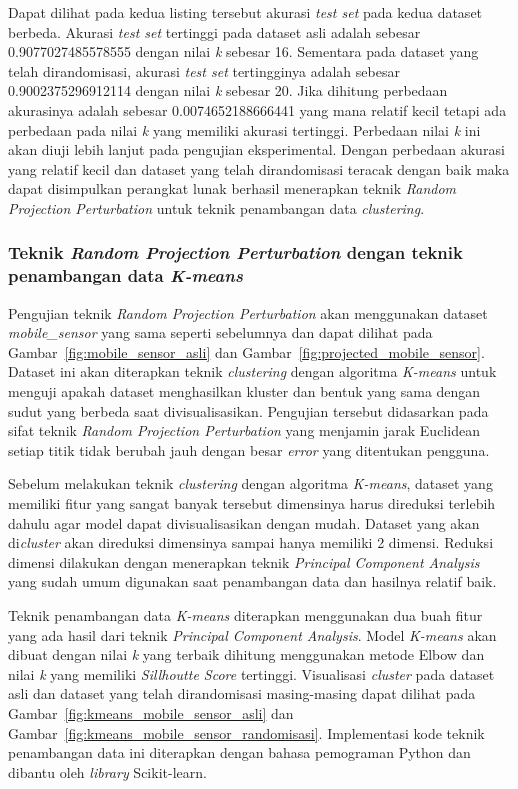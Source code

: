 Dapat dilihat pada kedua listing tersebut akurasi \textit{test set} pada kedua dataset berbeda. Akurasi \textit{test set} tertinggi pada dataset asli adalah sebesar 0.9077027485578555 dengan nilai \textit{k} sebesar 16. Sementara pada dataset yang telah dirandomisasi, akurasi \textit{test set} tertingginya adalah sebesar 0.9002375296912114 dengan nilai \textit{k} sebesar 20. Jika dihitung perbedaan akurasinya adalah sebesar 0.0074652188666441 yang mana relatif kecil tetapi ada perbedaan pada nilai \textit{k} yang memiliki akurasi tertinggi. Perbedaan nilai \textit{k} ini akan diuji lebih lanjut pada pengujian eksperimental. Dengan perbedaan akurasi yang relatif kecil dan dataset yang telah dirandomisasi teracak dengan baik maka dapat disimpulkan perangkat lunak berhasil menerapkan teknik \textit{Random Projection Perturbation} untuk teknik penambangan data \textit{clustering}.

\subsubsection{Teknik \textit{Random Projection Perturbation} dengan teknik penambangan data \textit{K-means}}
\label{sec:rpp-kmeans}

Pengujian teknik \textit{Random Projection Perturbation} akan menggunakan dataset \textit{mobile\_sensor} yang sama seperti sebelumnya dan dapat dilihat pada Gambar~\ref{fig:mobile_sensor_asli} dan Gambar~\ref{fig:projected_mobile_sensor}. Dataset ini akan diterapkan teknik \textit{clustering} dengan algoritma \textit{K-means} untuk menguji apakah dataset menghasilkan kluster dan bentuk yang sama dengan sudut yang berbeda saat divisualisasikan. Pengujian tersebut didasarkan pada sifat teknik \textit{Random Projection Perturbation} yang menjamin jarak Euclidean setiap titik tidak berubah jauh dengan besar \textit{error} yang ditentukan pengguna.

Sebelum melakukan teknik \textit{clustering} dengan algoritma \textit{K-means}, dataset yang memiliki fitur yang sangat banyak tersebut dimensinya harus direduksi terlebih dahulu agar model dapat divisualisasikan dengan mudah. Dataset yang akan di\textit{cluster} akan direduksi dimensinya sampai hanya memiliki 2 dimensi. Reduksi dimensi dilakukan dengan menerapkan teknik \textit{Principal Component Analysis} yang sudah umum digunakan saat penambangan data dan hasilnya relatif baik.

Teknik penambangan data \textit{K-means} diterapkan menggunakan dua buah fitur yang ada hasil dari teknik \textit{Principal Component Analysis}. Model \textit{K-means} akan dibuat dengan nilai \textit{k} yang terbaik dihitung menggunakan metode Elbow dan nilai \textit{k} yang memiliki \textit{Sillhoutte Score} tertinggi. Visualisasi \textit{cluster} pada dataset asli dan dataset yang telah dirandomisasi masing-masing dapat dilihat pada Gambar~\ref{fig:kmeans_mobile_sensor_asli} dan Gambar~\ref{fig:kmeans_mobile_sensor_randomisasi}. Implementasi kode teknik penambangan data ini diterapkan dengan bahasa pemograman Python dan dibantu oleh \textit{library} Scikit-learn. 

